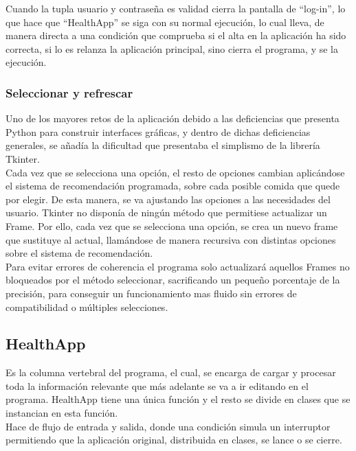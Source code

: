 Cuando la tupla usuario y contraseña es validad cierra la pantalla de “log-in”, lo que hace que  “HealthApp” se siga con su normal ejecución, lo cual lleva, de manera directa a una condición que comprueba si el alta en la aplicación ha sido correcta, si lo es relanza la aplicación principal, sino cierra el programa, y se la ejecución.\\

\subsubsection{Seleccionar y refrescar}
Uno de los mayores retos de la aplicación debido a las deficiencias que presenta Python para construir interfaces gráficas, y dentro de dichas deficiencias generales, se añadía la dificultad que presentaba el simplismo de la librería Tkinter.\\

Cada vez que se selecciona una opción, el resto de opciones cambian aplicándose el sistema de recomendación programada, sobre cada posible comida que quede por elegir. De esta manera, se va ajustando las opciones a las necesidades del usuario. Tkinter no disponía de ningún método que permitiese actualizar un Frame. Por ello, cada vez que se selecciona una opción, se crea un nuevo frame que sustituye al actual, llamándose de manera recursiva con distintas opciones sobre el sistema de recomendación.\\

Para evitar errores de coherencia el programa solo actualizará aquellos Frames no bloqueados por el método seleccionar, sacrificando un pequeño porcentaje de la precisión, para conseguir un funcionamiento mas fluido sin errores de compatibilidad o múltiples selecciones.\\
\subsection{HealthApp}
Es la columna vertebral del programa, el cual, se encarga de cargar y procesar toda la información relevante que más adelante se va a ir editando en el programa. HealthApp tiene una única función y el resto se divide en clases que se instancian en esta función.\\

Hace de flujo de entrada y salida, donde una condición simula un interruptor permitiendo que la aplicación original, distribuida en clases, se lance o se cierre.\\

